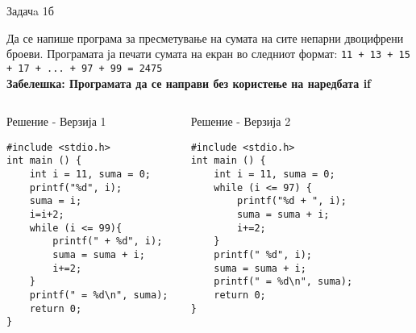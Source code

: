\begin{frame}[fragile]{Задачa 1б}
\begin{scriptsize}
Да се напише програма за пресметување на сумата на сите непарни двоцифрени броеви. Програмата ја печати сумата на екран во следниот формат:	\texttt{11 + 13 + 15 + 17 + ... + 97 + 99 = 2475}\\
\textbf{Забелешка: Програмата да се направи без користење на наредбата if}
\end{scriptsize}
\pause
\begin{columns}
\begin{exampleblock}{Решение - Верзија 1}
\begin{lstlisting}
#include <stdio.h>
int main () { 
    int i = 11, suma = 0; 
    printf("%d", i); 
    suma = i; 
    i=i+2; 
    while (i <= 99){ 
        printf(" + %d", i); 
        suma = suma + i; 
        i+=2; 
    } 
    printf(" = %d\n", suma); 
    return 0; 
}
\end{lstlisting}
\end{exampleblock}
\pause
{}
\begin{exampleblock}{Решение - Верзија 2}
\begin{lstlisting}
#include <stdio.h> 
int main () { 
    int i = 11, suma = 0; 
    while (i <= 97) { 
        printf("%d + ", i); 
        suma = suma + i; 
        i+=2; 
    } 
    printf(" %d", i); 
    suma = suma + i; 
    printf(" = %d\n", suma); 
    return 0; 
} 
\end{lstlisting}
\end{exampleblock}
\end{columns}
\end{frame}

